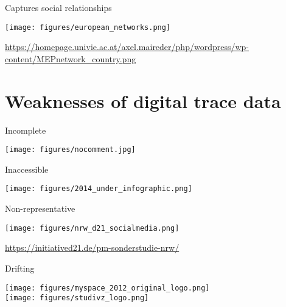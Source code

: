 \documentclass{beamer}
\def\vf{\vfill}
\begin{document}
\begin{frame}{Captures social relationships}

\begin{center}
	\texttt{[image: figures/european\_networks.png]}
\end{center}

\vf
\tiny{\url{https://homepage.univie.ac.at/axel.maireder/php/wordpress/wp-content/MEPnetwork_country.png}}

\end{frame}

\section{Weaknesses of digital trace data}

\begin{frame}{Incomplete}

\begin{center}
	\texttt{[image: figures/nocomment.jpg]}
\end{center}

\end{frame}



\begin{frame}{Inaccessible}

\begin{center}
	\texttt{[image: figures/2014\_under\_infographic.png]}
\end{center}

\end{frame}

\begin{frame}{Non-representative}

\begin{center}
	\texttt{[image: figures/nrw\_d21\_socialmedia.png]}
\end{center}

\vf
\tiny{\url{https://initiatived21.de/pm-sonderstudie-nrw/}}

\end{frame}

\begin{frame}{Drifting}

\begin{center}
	\texttt{[image: figures/myspace\_2012\_original\_logo.png]}
	\\
	\texttt{[image: figures/studivz\_logo.png]}
\end{center}

\end{frame}
\end{document}
